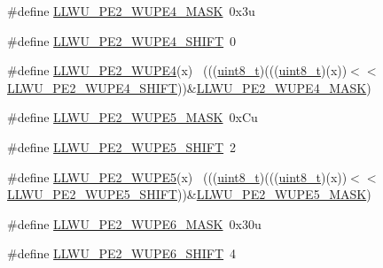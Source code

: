 \begin{DoxyCompactItemize}
\item 
\#define \hyperlink{group___l_l_w_u___register___masks_ga94128d26c60f13d22acf47200f4f37e0}{L\+L\+W\+U\+\_\+\+P\+E2\+\_\+\+W\+U\+P\+E4\+\_\+\+M\+A\+SK}~0x3u
\item 
\#define \hyperlink{group___l_l_w_u___register___masks_ga12aa6ffb998e5273a8dd548ac434ad41}{L\+L\+W\+U\+\_\+\+P\+E2\+\_\+\+W\+U\+P\+E4\+\_\+\+S\+H\+I\+FT}~0
\item 
\#define \hyperlink{group___l_l_w_u___register___masks_ga66bcf97ee2fda285ac3a24ba5cc0b1a1}{L\+L\+W\+U\+\_\+\+P\+E2\+\_\+\+W\+U\+P\+E4}(x)                                            ~(((\hyperlink{_p_e___types_8h_aba7bc1797add20fe3efdf37ced1182c5}{uint8\+\_\+t})(((\hyperlink{_p_e___types_8h_aba7bc1797add20fe3efdf37ced1182c5}{uint8\+\_\+t})(x))$<$$<$\hyperlink{group___l_l_w_u___register___masks_ga12aa6ffb998e5273a8dd548ac434ad41}{L\+L\+W\+U\+\_\+\+P\+E2\+\_\+\+W\+U\+P\+E4\+\_\+\+S\+H\+I\+FT}))\&\hyperlink{group___l_l_w_u___register___masks_ga94128d26c60f13d22acf47200f4f37e0}{L\+L\+W\+U\+\_\+\+P\+E2\+\_\+\+W\+U\+P\+E4\+\_\+\+M\+A\+SK})
\item 
\#define \hyperlink{group___l_l_w_u___register___masks_gacfb855231e7a1c11c64d8b4e951817be}{L\+L\+W\+U\+\_\+\+P\+E2\+\_\+\+W\+U\+P\+E5\+\_\+\+M\+A\+SK}~0x\+Cu
\item 
\#define \hyperlink{group___l_l_w_u___register___masks_ga4e823ada9bfc21dca4729eedf4e63778}{L\+L\+W\+U\+\_\+\+P\+E2\+\_\+\+W\+U\+P\+E5\+\_\+\+S\+H\+I\+FT}~2
\item 
\#define \hyperlink{group___l_l_w_u___register___masks_gac3a8a230033b46633beb6b1ddb282bfd}{L\+L\+W\+U\+\_\+\+P\+E2\+\_\+\+W\+U\+P\+E5}(x)                                            ~(((\hyperlink{_p_e___types_8h_aba7bc1797add20fe3efdf37ced1182c5}{uint8\+\_\+t})(((\hyperlink{_p_e___types_8h_aba7bc1797add20fe3efdf37ced1182c5}{uint8\+\_\+t})(x))$<$$<$\hyperlink{group___l_l_w_u___register___masks_ga4e823ada9bfc21dca4729eedf4e63778}{L\+L\+W\+U\+\_\+\+P\+E2\+\_\+\+W\+U\+P\+E5\+\_\+\+S\+H\+I\+FT}))\&\hyperlink{group___l_l_w_u___register___masks_gacfb855231e7a1c11c64d8b4e951817be}{L\+L\+W\+U\+\_\+\+P\+E2\+\_\+\+W\+U\+P\+E5\+\_\+\+M\+A\+SK})
\item 
\#define \hyperlink{group___l_l_w_u___register___masks_ga0db50e96153e1ca74874da97d1c22f41}{L\+L\+W\+U\+\_\+\+P\+E2\+\_\+\+W\+U\+P\+E6\+\_\+\+M\+A\+SK}~0x30u
\item 
\#define \hyperlink{group___l_l_w_u___register___masks_gaa7a0191eaf60166333a8bee953239c85}{L\+L\+W\+U\+\_\+\+P\+E2\+\_\+\+W\+U\+P\+E6\+\_\+\+S\+H\+I\+FT}~4
\item 

\end{DoxyCompactItemize}
